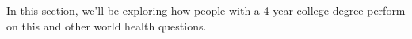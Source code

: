 In this section,
we'll be exploring how people with a 4-year college
degree perform on this and other world health questions.

\newcommand{\roslingAsize}{50}
\newcommand{\roslingAprop}{0.24}
\newcommand{\roslingApropcomplement}{0.76}
\newcommand{\roslingApercent}{24}
\newcommand{\roslingApercentcomplement}{76}
\newcommand{\roslingAcount}{12}
\newcommand{\roslingAcountcomplement}{38}
\newcommand{\roslingAse}{0.060}







%
%




